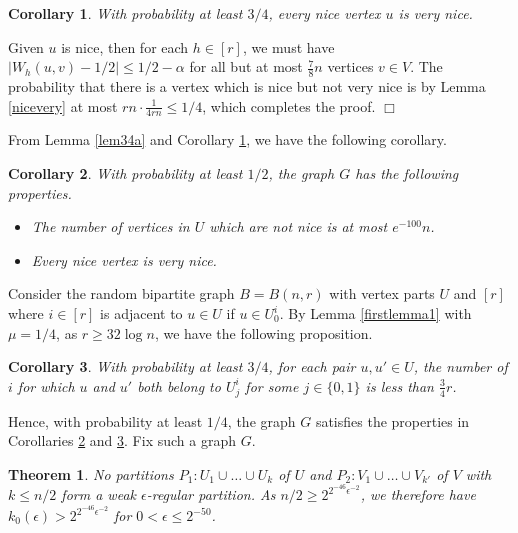 \documentclass[11pt]{article}
\newtheorem{theorem}{Theorem}[section]
\newtheorem{corollary}{Corollary}[section]
\newenvironment{proof}
      {\medskip\noindent{\bf Proof:}\hspace{1mm}}
      {\hfill$\Box$\medskip}
\begin{document}
\begin{corollary}\label{cor34b}
With probability at least $3/4$, every nice vertex $u$ is very nice.
\end{corollary}
\begin{proof}
Given $u$ is nice, then for each $h \in [r]$, we must have $|W_h(u,v)-1/2| \leq
1/2-\alpha$ for all but at most $\frac{7}{8}n$ vertices $v \in V$. The
probability that there is a vertex which is nice but not very nice is by Lemma
\ref{nicevery} at most $rn \cdot \frac{1}{4rn} \leq 1/4$, which completes the
proof.
\end{proof}

From Lemma \ref{lem34a} and Corollary \ref{cor34b}, we have the following
corollary.

\begin{corollary}\label{cor12c}
With probability at least $1/2$, the graph $G$ has the following properties.
\begin{itemize}
\item The number of vertices in $U$ which are not nice is at most $e^{-100}n$.
\item Every nice vertex is very nice.
\end{itemize}
\end{corollary}

Consider the random bipartite graph $B=B(n,r)$ with vertex parts $U$ and $[r]$
where $i \in [r]$ is adjacent to $u \in U$ if $u \in U_0^i$. By Lemma
\ref{firstlemma1} with $\mu=1/4$, as $r \geq 32\log n$, we have the following
proposition.

\begin{corollary} \label{prop1n2}
With probability at least $3/4$, for each pair $u,u' \in U$, the number of $i$
for which $u$ and $u'$ both belong to $U_j^i$ for some $j \in \{0,1\}$ is less
than $\frac{3}{4}r$.
\end{corollary}

Hence, with probability at least $1/4$, the graph $G$ satisfies the properties
in Corollaries \ref{cor12c} and \ref{prop1n2}. Fix such a graph $G$.

\begin{theorem}\label{lowbo}
No partitions $P_1:U_1 \cup \ldots \cup U_k$ of $U$ and $P_2:V_1 \cup \ldots
\cup V_{k'}$ of $V$ with $k \leq n/2$ form a weak $\epsilon$-regular partition.
As $n/2 \geq 2^{2^{-46}\epsilon^{-2}}$, we therefore have $k_0(\epsilon) >
2^{2^{-46}\epsilon^{-2}}$ for $0 < \epsilon \leq 2^{-50}$.
\end{theorem}
\end{document}

